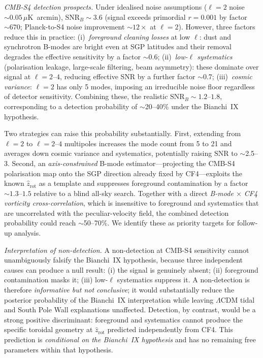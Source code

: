 \documentclass[12pt]{article}
\begin{document}
\emph{CMB-S4 detection prospects.}
Under idealised noise assumptions ($\ell=2$ noise $\sim0.05\,\mu$K~arcmin),
$\mathrm{SNR}_B\sim3.6$ (signal exceeds primordial $r=0.001$ by factor
$\sim670$; Planck-to-S4 noise improvement $\sim12\times$ at $\ell=2$).
However, three factors reduce this in practice:
(i)~\emph{foreground cleaning losses} at low $\ell$: dust and synchrotron
B-modes are bright even at SGP latitudes and their removal degrades the
effective sensitivity by a factor $\sim0.6$;
(ii)~\emph{low-$\ell$ systematics} (polarisation leakage, large-scale
filtering, beam asymmetry): these dominate over signal at $\ell=2$--$4$,
reducing effective SNR by a further factor $\sim0.7$;
(iii)~\emph{cosmic variance}: $\ell=2$ has only 5 modes, imposing an
irreducible noise floor regardless of detector sensitivity.
Combining these, the realistic $\mathrm{SNR}_B\sim1.2$--$1.8$, corresponding
to a detection probability of $\sim$20--40\% under the Bianchi~IX hypothesis.

Two strategies can raise this probability substantially.
First, extending from $\ell=2$ to $\ell=2$--$4$ multipoles increases the
mode count from 5 to 21 and averages down cosmic variance and systematics,
potentially raising $\mathrm{SNR}$ to $\sim$2.5--3.
Second, an \emph{axis-constrained} B-mode estimator---projecting the CMB-S4
polarisation map onto the SGP direction already fixed by CF4---exploits
the known $\hat{z}_\mathrm{rot}$ as a template and suppresses foreground
contamination by a factor $\sim1.3$--$1.5$ relative to a blind all-sky
search. Together with a direct \emph{B-mode $\times$ CF4 vorticity
cross-correlation}, which is insensitive to foreground and systematics
that are uncorrelated with the peculiar-velocity field, the combined
detection probability could reach $\sim$50--70\%. We identify these as
priority targets for follow-up analysis.

\emph{Interpretation of non-detection.}
A non-detection at CMB-S4 sensitivity cannot unambiguously falsify the
Bianchi~IX hypothesis, because three independent causes can produce a
null result: (i) the signal is genuinely absent; (ii) foreground
contamination masks it; (iii) low-$\ell$ systematics suppress it.
A non-detection is therefore \emph{informative but not conclusive};
it would substantially reduce the posterior probability of the Bianchi~IX
interpretation while leaving $\Lambda$CDM tidal and South Pole Wall
explanations unaffected.
Detection, by contrast, would be a strong positive discriminant: foreground
and systematics cannot produce the specific toroidal geometry at $\hat{z}_\mathrm{rot}$
predicted independently from CF4.
This prediction is \emph{conditional on the Bianchi~IX hypothesis} and has
no remaining free parameters within that hypothesis.
\end{document}
